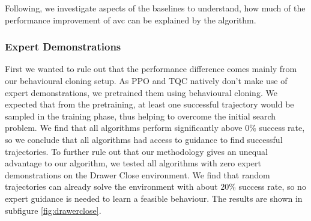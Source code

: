 Following, we investigate aspects of the baselines to understand, how much of the performance improvement of \ac{avc} can be explained by the algorithm. 

\subsubsection{Expert Demonstrations}
First we wanted to rule out that the performance difference comes mainly from our behavioural cloning setup. As PPO and TQC natively don't make use of expert demonstrations,
we pretrained them using behavioural cloning. We expected that from the pretraining, at least one successful trajectory would be sampled in the training phase, thus
helping to overcome the initial search problem. We find that all algorithms perform significantly above $0\%$ success rate, so we conclude that all algorithms had
access to guidance to find successful trajectories. To further rule out that our methodology gives an unequal advantage to our algorithm, we tested all algorithms with 
zero expert demonstrations on the 
Drawer Close environment. We find that random trajectories can already solve the environment with about $20\%$ success rate, so no expert guidance is needed to learn a feasible behaviour.
The results are shown in subfigure \ref{fig:drawerclose}.\\ 

